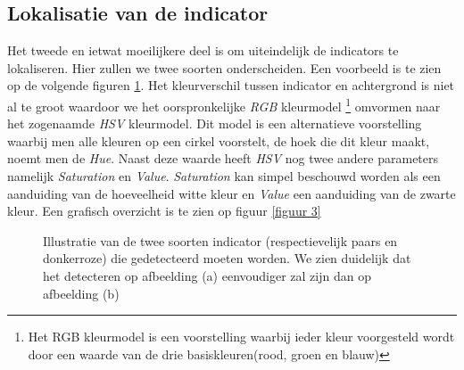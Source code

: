 \documentclass[a4paper,kulak]{kulakarticle}
\begin{document}
\subsection{Lokalisatie van de indicator}
Het tweede en ietwat moeilijkere deel is om uiteindelijk de indicators te lokaliseren. Hier zullen we twee soorten onderscheiden. Een voorbeeld is te zien op de volgende figuren \ref{figuur 2}. Het kleurverschil tussen indicator en achtergrond is niet al te groot waardoor we het oorspronkelijke \textit{RGB} kleurmodel \footnote{Het RGB kleurmodel is een voorstelling waarbij ieder kleur voorgesteld wordt door een waarde van de drie basiskleuren(rood, groen en blauw)} omvormen naar het zogenaamde \textit{HSV} kleurmodel. Dit model is een alternatieve voorstelling waarbij men alle kleuren op een cirkel voorstelt, de hoek die dit kleur maakt, noemt men de \textit{Hue}. Naast deze waarde heeft \textit{HSV} nog twee andere parameters namelijk \textit{Saturation} en \textit{Value}. \textit{Saturation} kan simpel beschouwd worden als een aanduiding van de hoeveelheid witte kleur en \textit{Value} een aanduiding van de zwarte kleur. Een grafisch overzicht is te zien op figuur \ref{figuur 3}
\begin{figure}[H]
	\centering
	\qquad
	
	\caption{Illustratie van de twee soorten indicator (respectievelijk paars en donkerroze) die gedetecteerd moeten worden. We zien duidelijk dat het detecteren op afbeelding (a) eenvoudiger zal zijn dan op afbeelding (b)}
	\label{figuur 2}
\end{figure}
\end{document}
